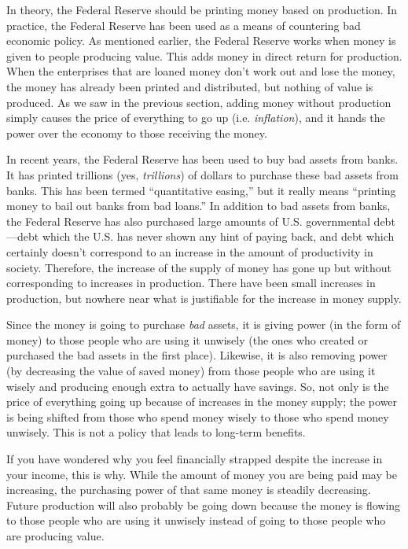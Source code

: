 In theory, the Federal Reserve should be printing money based on
production. In practice, the Federal Reserve has been used as a means
of countering bad economic policy. As mentioned earlier, the Federal
Reserve works when money is given to people producing value. This adds
money in direct return for production. When the enterprises that 
are loaned money don't work out and lose the money, 
the money has already been printed and distributed, but nothing of value is produced. As we saw
in the previous section, adding money without production simply causes
the price of everything to go up (i.e. \textit{inflation}), and it hands the power over the
economy to those receiving the money.

In recent years, the Federal Reserve has been used to buy bad assets
from banks. It has printed trillions (yes, \textit{trillions}) of
dollars to purchase these bad assets from banks. This has been termed
“quantitative easing,” but it really means “printing money to bail out
banks from bad loans.”  In addition to bad assets from banks, the
Federal Reserve has also purchased large amounts of U.S. governmental
debt---debt which the U.S. has never shown any hint of paying back, and
debt which certainly doesn't correspond to an increase in the amount
of productivity in society.
Therefore, the increase of the supply of money has gone up but without
corresponding to increases in production. There have been small
increases in production, but nowhere near what is justifiable for the
increase in money supply. 

Since the money is going to purchase
\textit{bad} assets, it is giving power (in the form of money) to those
people who are using it unwisely (the ones who created or purchased the
bad assets in the first place).  Likewise, it is also removing power
(by decreasing the value of saved money) from those people who are
using it wisely and
producing enough extra to actually have
savings.  So, not
only is the price of everything going up because of increases in the
money supply; the power is being shifted from those who spend money
wisely to those who spend money unwisely. This is not a policy that
leads to long-term benefits.

If you have wondered why you feel financially strapped despite the
increase in your income, this is why. While the amount of money you are
being paid may be increasing, the purchasing power of that same money
is steadily decreasing. Future production will also probably be going down
because the money is flowing to those people who are using it unwisely
instead of going to those people who are producing value.

